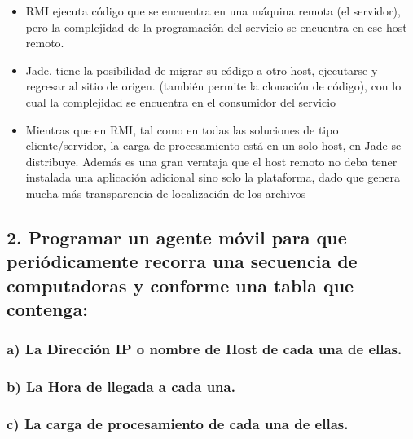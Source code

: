 \documentclass[11pt]{extarticle}
\begin{document}
\begin{itemize}
\item
  RMI ejecuta código que se encuentra en una máquina remota (el
  servidor), pero la complejidad de la programación del servicio se
  encuentra en ese host remoto.
\item
  Jade, tiene la posibilidad de migrar su código a otro host, ejecutarse
  y regresar al sitio de origen. (también permite la clonación de
  código), con lo cual la complejidad se encuentra en el consumidor del
  servicio
\item
  Mientras que en RMI, tal como en todas las soluciones de tipo
  cliente/servidor, la carga de procesamiento está en un solo host, en
  Jade se distribuye. Además es una gran verntaja que el host remoto no
  deba tener instalada una aplicación adicional sino solo la plataforma,
  dado que genera mucha más transparencia de localización de los
  archivos
\end{itemize}

    \hypertarget{programar-un-agente-muxf3vil-para-que-periuxf3dicamente-recorra-una-secuencia-de-computadoras-y-conforme-una-tabla-que-contenga}{%
\subsection{2. Programar un agente móvil para que periódicamente recorra
una secuencia de computadoras y conforme una tabla que
contenga:}\label{programar-un-agente-muxf3vil-para-que-periuxf3dicamente-recorra-una-secuencia-de-computadoras-y-conforme-una-tabla-que-contenga}}

    \hypertarget{a-la-direcciuxf3n-ip-o-nombre-de-host-de-cada-una-de-ellas.}{%
\subsubsection{a) La Dirección IP o nombre de Host de cada una de
ellas.}\label{a-la-direcciuxf3n-ip-o-nombre-de-host-de-cada-una-de-ellas.}}

    \hypertarget{b-la-hora-de-llegada-a-cada-una.}{%
\subsubsection{b) La Hora de llegada a cada
una.}\label{b-la-hora-de-llegada-a-cada-una.}}

    \hypertarget{c-la-carga-de-procesamiento-de-cada-una-de-ellas.}{%
\subsubsection{c) La carga de procesamiento de cada una de
ellas.}\label{c-la-carga-de-procesamiento-de-cada-una-de-ellas.}}
\end{document}
